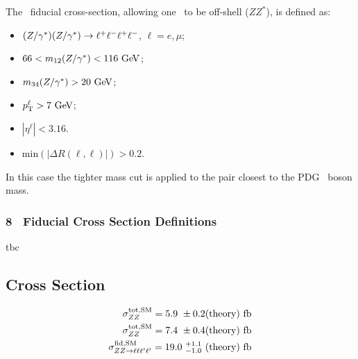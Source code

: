 The \zzllll\ fiducial cross-section, allowing one \Z\ to be off-shell ($ZZ^*$), is defined as:

\begin{itemize}
\item $(Z/\gamma^*)(Z/\gamma^*)\rightarrow\ell^+ \ell^-\ell^+ \ell^-$, $\ell = e,\mu$;
\item $66 < m_{12}(\Z/\gamma^*) <  116\GeV$;
\item $m_{34}(\Z/\gamma^*) > 20\GeV$;
\item $\pT^{\ell} > 7\GeV$;
\item $|\eta^{\ell}| < 3.16$.
\item $\mathrm{min}(|\Delta R(\ell,\ell)|) > 0.2$.
\end{itemize}

In this case the tighter mass cut is applied to the pair closest to the PDG \Z\
boson mass.

\subsubsection{8 \tev\ Fiducial Cross Section Definitions}

tbc

\subsection{Cross Section}

\begin{align}
\sigma^{\rm tot,SM}_{ZZ} = 5.9\ \pm 0.2 {\rm
(theory)\
fb} \\
\sigma^{\rm tot,SM}_{ZZ} = 7.4\ \pm 0.4 {\rm (theory)\ fb} \\
\sigma^{\rm fid,SM}_{ZZ\rightarrow\ell\ell\ell'\ell'} = 19.0\ ^{+1.1}_{-1.0}\ {\rm (theory)\ fb} 
\end{align}

